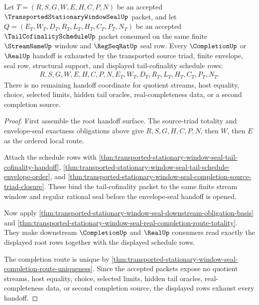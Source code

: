 \begin{theorem}
\label{thm:transported-stationary-window-seal-completion-handoff-exhaustion}
Let $T=(R,S,G,W,E,H,C,P,N)$ be an accepted $\TransportedStationaryWindowSealUp$ packet, and let $Q=(E_T,W_T,D_T,R_T,L_T,H_T,C_T,P_T,N_T)$ be an accepted $\TailCofinalityScheduleUp$ packet consumed on the same finite $\StreamNameUp$ window and $\RegSeqRatUp$ seal row. Every $\CompletionUp$ or $\RealUp$ handoff is exhausted by the transported source triad, finite envelope, seal row, structural support, and displayed tail-cofinality schedule rows:
$$
\begin{aligned}
  R,S,G,W,E,H,C,P,N,
  E_T,W_T,D_T,R_T,L_T,H_T,C_T,P_T,N_T .
\end{aligned}
$$
There is no remaining handoff coordinate for quotient streams, host equality, choice, selected limits, hidden tail oracles, real-completeness data, or a second completion source.
\end{theorem}
\begin{proof}
First assemble the root handoff surface. The source-triad totality and envelope-seal exactness obligations above give $R,S,G,H,C,P,N$, then $W$, then $E$ as the ordered local route.

Attach the schedule rows with \autoref{thm:transported-stationary-window-seal-tail-cofinality-handoff}, \autoref{thm:transported-stationary-window-seal-tail-schedule-envelope-order}, and \autoref{thm:transported-stationary-window-seal-completion-source-triad-closure}. These bind the tail-cofinality packet to the same finite stream window and regular rational seal before the envelope-seal handoff is opened.

Now apply \autoref{thm:transported-stationary-window-seal-downstream-obligation-basis} and \autoref{thm:transported-stationary-window-seal-real-completion-route-totality}. They make downstream $\CompletionUp$ and $\RealUp$ consumers read exactly the displayed root rows together with the displayed schedule rows.

The completion route is unique by \autoref{thm:transported-stationary-window-seal-completion-route-uniqueness}. Since the accepted packets expose no quotient streams, host equality, choice, selected limits, hidden tail oracles, real-completeness data, or second completion source, the displayed rows exhaust every handoff.
\end{proof}
